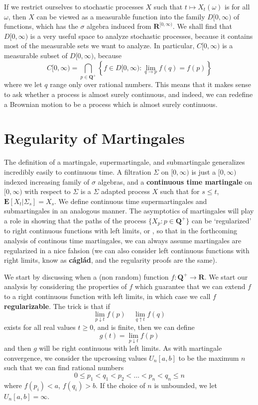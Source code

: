 If we restrict ourselves to stochastic processes $X$ such that $t \mapsto X_t(\omega)$ is \cadlag for all $\omega$, then $X$ can be viewed as a measurable function into the family $D[0,\infty)$ of \cadlag functions, which has the $\sigma$ algebra induced from $\mathbf{R}^{[0,\infty)}$. We shall find that $D[0,\infty)$ is a very useful space to analyze stochastic processes, because it contains most of the measurable sets we want to analyze. In particular, $C[0,\infty)$ is a measurable subset of $D[0,\infty)$, because
%
\[ C[0,\infty) = \bigcap_{p \in \mathbf{Q}^+} \left\{ f \in D[0,\infty): \lim_{q \to p} f(q) = f(p) \right\} \]
%
where we let $q$ range only over rational numbers. This means that it makes sense to ask whether a \cadlag process is almost surely continuous, and indeed, we can redefine a Brownian motion to be a \cadlag process which is almost surely continuous.

\section{Regularity of Martingales}

The definition of a martingale, supermartingale, and submartingale generalizes incredibly easily to continuous time. A filtration $\Sigma$ on $[0,\infty)$ is just a $[0,\infty)$ indexed increasing family of $\sigma$ algebras, and a {\bf continuous time martingale} on $[0,\infty)$ with respect to $\Sigma$ is a $\Sigma$ adapted process $X$ such that for $s \leq t$, $\mathbf{E}[X_t|\Sigma_s] = X_s$. We define continuous time supermartingales and submartingales in an analogous manner. The asymptotics of martingales will play a role in showing that the paths of the process $\{ X_p: p \in \mathbf{Q}^+ \}$ can be `regularized' to right continuous functions with left limits, or {\bf \cadlag}, so that in the forthcoming analysis of continous time martingales, we can always assume martingales are regularized in a nice fahsion (we can also consider left continuous functions with right limits, know as {\bf c\'{a}gl\'{a}d}, and the regularity proofs are the same).

We start by discussing when a (non random) function $f: \mathbf{Q}^+ \to \mathbf{R}$. We start our analysis by considering the properties of $f$ which guarantee that we can extend $f$ to a right continuous function with left limits, in which case we call $f$ {\bf regularizable}. The trick is that if
%
\[ \lim_{p \downarrow t} f(p)\ \ \ \ \ \lim_{q \uparrow t} f(q) \]
%
exists for all real values $t \geq 0$, and is finite, then we can define
%
\[ g(t) = \lim_{p \downarrow t} f(p) \]
%
and then $g$ will be right continuous with left limits. As with martingale convergence, we consider the upcrossing values $U_n[a,b]$ to be the maximum $n$ such that we can find rational numbers
%
\[ 0 \leq p_1 < q_1 < p_2 < \dots < p_n < q_n \leq n \]
%
where $f(p_i) < a$, $f(q_i) > b$. If the choice of $n$ is unbounded, we let $U_n[a,b] = \infty$.

